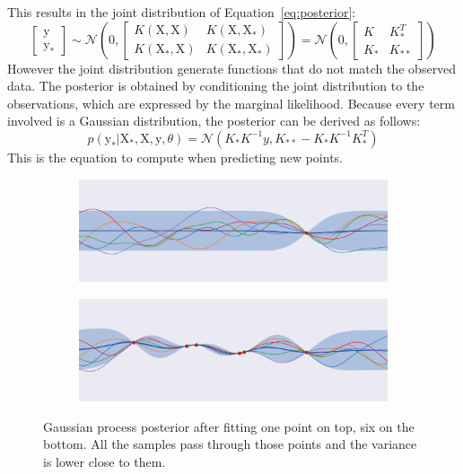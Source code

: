 This results in the joint distribution of Equation~\ref{eq:posterior}:
\begin{equation}
    \begin{bmatrix}
    \mathrm{y} \\
    \mathrm{y_*}
    \end{bmatrix}
    \sim
    \mathcal{N} \left( 0, 
    \begin{bmatrix}
    K(\mathrm{X}, \mathrm{X}) & K(\mathrm{X}, \mathrm{X_*}) \\
    K(\mathrm{X_*}, \mathrm{X}) & K(\mathrm{X_*}, \mathrm{X_*})
    \end{bmatrix}
    \right)
    =
    \mathcal{N} \left( 0, 
    \begin{bmatrix}
    K & K_*^T \\
    K_* & K_{**}
    \end{bmatrix}
    \right)
\end{equation}
However the joint distribution generate functions that do not match the observed data. The posterior is obtained by conditioning the joint distribution to the observations, which are expressed by the marginal likelihood. Because every term involved is a Gaussian distribution, the posterior can be derived as follows:
\begin{equation}
    p\left( \mathrm{y_*} | \mathrm{X_*}, \mathrm{X}, \mathrm{y}, \theta \right)
    =
    \mathcal{N} \left( K_* K^{-1} y, 
    K_{**} - K_* K^{-1} K_*^T \right)
\end{equation}
This is the equation to compute when predicting new points. 

\begin{figure}[htb]
    \centering
    \begin{subfigure}[b]{\textwidth}
        \includegraphics[width=\textwidth]{img_hyperopt/gp_posterior_1_point}
    \end{subfigure}

    \begin{subfigure}[b]{\textwidth}
        \includegraphics[width=\textwidth]{img_hyperopt/gp_posterior_6_point}
    \end{subfigure}
    \caption{Gaussian process posterior after fitting one point on top, six on the bottom. All the samples pass through those points and the variance is lower close to them.}
    \label{fig:gp_posterior}
\end{figure}

